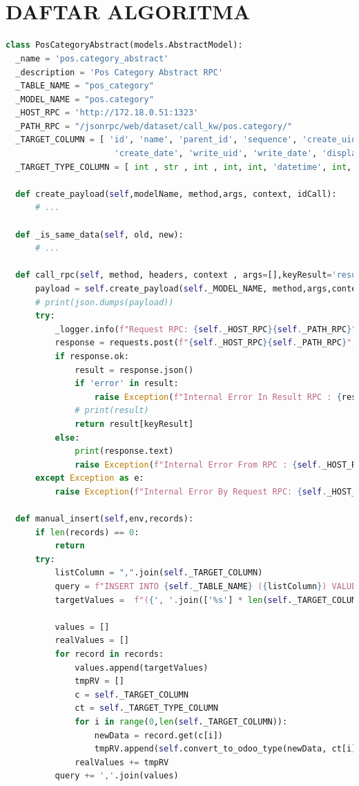 \chapter{\\ DAFTAR ALGORITMA}

\begin{lstlisting}[style=mystyle, language=Python, caption={Penerapan Class Abstract}]
class PosCategoryAbstract(models.AbstractModel):
  _name = 'pos.category_abstract'
  _description = 'Pos Category Abstract RPC'
  _TABLE_NAME = "pos_category"
  _MODEL_NAME = "pos.category"
  _HOST_RPC = 'http://172.18.0.51:1323'
  _PATH_RPC = "/jsonrpc/web/dataset/call_kw/pos.category/"
  _TARGET_COLUMN = [ 'id', 'name', 'parent_id', 'sequence', 'create_uid', 
                      'create_date', 'write_uid', 'write_date', 'display_name',  'has_image']
  _TARGET_TYPE_COLUMN = [ int , str , int , int, int, 'datetime', int, 'datetime', str,  bool]    
  
  def create_payload(self,modelName, method,args, context, idCall):
      # ...
  
  def _is_same_data(self, old, new):
      # ...
    
  def call_rpc(self, method, headers, context , args=[],keyResult='result'):
      payload = self.create_payload(self._MODEL_NAME, method,args,context,1)
      # print(json.dumps(payload))
      try:
          _logger.info(f"Request RPC: {self._HOST_RPC}{self._PATH_RPC}")
          response = requests.post(f"{self._HOST_RPC}{self._PATH_RPC}", headers=headers, data=json.dumps(payload))
          if response.ok:
              result = response.json()
              if 'error' in result:
                  raise Exception(f"Internal Error In Result RPC : {result['error']}")
              # print(result)
              return result[keyResult]
          else:
              print(response.text)
              raise Exception(f"Internal Error From RPC : {self._HOST_RPC}{self._PATH_RPC} - Response Not OK")
      except Exception as e:
          raise Exception(f"Internal Error By Request RPC: {self._HOST_RPC}{self._PATH_RPC}  ")
    
  def manual_insert(self,env,records):
      if len(records) == 0:
          return
      try:
          listColumn = ",".join(self._TARGET_COLUMN)
          query = f"INSERT INTO {self._TABLE_NAME} ({listColumn}) VALUES "
          targetValues =  f"({', '.join(['%s'] * len(self._TARGET_COLUMN))})"
          
          values = []
          realValues = []
          for record in records:
              values.append(targetValues)
              tmpRV = []
              c = self._TARGET_COLUMN
              ct = self._TARGET_TYPE_COLUMN
              for i in range(0,len(self._TARGET_COLUMN)):
                  newData = record.get(c[i])
                  tmpRV.append(self.convert_to_odoo_type(newData, ct[i]))
              realValues += tmpRV
          query += ','.join(values)
          

\end{lstlisting}
